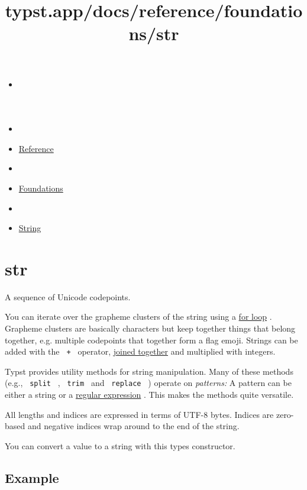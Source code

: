\title{typst.app/docs/reference/foundations/str}

\begin{itemize}
\tightlist
\item
  \href{/docs}{}
\item
  
\item
  \href{/docs/reference/}{Reference}
\item
  
\item
  \href{/docs/reference/foundations/}{Foundations}
\item
  
\item
  \href{/docs/reference/foundations/str/}{String}
\end{itemize}

\section{\texorpdfstring{{ str }}{ str }}\label{summary}

A sequence of Unicode codepoints.

You can iterate over the grapheme clusters of the string using a
\href{/docs/reference/scripting/\#loops}{for loop} . Grapheme clusters
are basically characters but keep together things that belong together,
e.g. multiple codepoints that together form a flag emoji. Strings can be
added with the \texttt{\ +\ } operator,
\href{/docs/reference/scripting/\#blocks}{joined together} and
multiplied with integers.

Typst provides utility methods for string manipulation. Many of these
methods (e.g., \texttt{\ split\ } , \texttt{\ trim\ } and
\texttt{\ replace\ } ) operate on \emph{patterns:} A pattern can be
either a string or a \href{/docs/reference/foundations/regex/}{regular
expression} . This makes the methods quite versatile.

All lengths and indices are expressed in terms of UTF-8 bytes. Indices
are zero-based and negative indices wrap around to the end of the
string.

You can convert a value to a string with this type\textquotesingle s
constructor.

\subsection{Example}\label{example}

